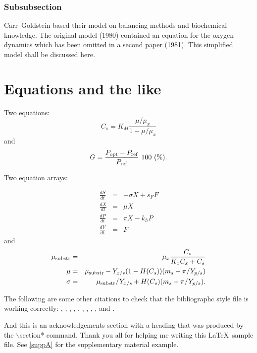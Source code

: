 \documentclass[ba]{imsart}
\numberwithin{equation}{section}
\theoremstyle{plain}
\begin{document}
\subsubsection{Subsubsection}

Carr--Goldstein based their model on balancing methods and biochemical
know\-ledge. The original model (1980) contained an equation for the
oxygen dynamics which has been omitted in a second paper (1981). This
simplified model shall be discussed here.

\section{Equations and the like}

Two equations:
\begin{equation}
    C_{s}  =  K_{M} \frac{\mu/\mu_{x}}{1-\mu/\mu_{x}} \label{ccs}
\end{equation}
and
\begin{equation}
    G = \frac{P_{\rm opt} - P_{\rm ref}}{P_{\rm ref}} \mbox{\ }100 \mbox{\ }(\%).
\end{equation}

Two equation arrays:

\begin{eqnarray}
  \frac{dS}{dt} & = & - \sigma X + s_{F} F\\
  \frac{dX}{dt} & = &   \mu    X\\
  \frac{dP}{dt} & = &   \pi    X - k_{h} P\\
  \frac{dV}{dt} & = &   F
\end{eqnarray}
and
\begin{eqnarray}
 \mu_{\rm substr} & = & \mu_{x} \frac{C_{s}}{K_{x}C_{x}+C_{s}}  \\
 \mu              & = & \mu_{\rm substr} - Y_{x/s}(1-H(C_{s}))(m_{s}+\pi /Y_{p/s}) \\
 \sigma           & = & \mu_{\rm substr}/Y_{x/s}+ H(C_{s}) (m_{s}+ \pi /Y_{p/s}).
\end{eqnarray}



\begin{supplement}
\label{suppA} 
\end{supplement}


The following are some other citations to check that the bibliographc style
file is working correctly: \citet{akaike}, \citet*{akivarsq}, \citet{dyke},
\citet{greene}, \citet*{kstuart}, \citet{hilbetech}, \citet{hilbe},
\citet{hilbeglm}, \citet{maddalacntrsq}, and \citet*{companion}.  





\begin{acknowledgement}
And this is an acknowledgements section with a heading that was produced by the
$\backslash$section* command. Thank you all for helping me writing this
\LaTeX\ sample file. See \ref{suppA} for the supplementary material example.
\end{acknowledgement}
\end{document}
